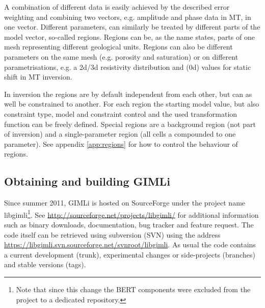 A combination of different data is easily achieved by the described error weighting and combining two vectors, e.g. amplitude and phase data in MT, in one vector.
Different parameters, can similarly be treated by different parts of the model vector, so-called regions.
Regions can be, as the name states, parts of one mesh representing different geological units.
Regions can also be different parameters on the same mesh (e.g. porosity and saturation) or on different parametrisations, e.g. a 2d/3d resistivity distribution and (0d) values for static shift in MT inversion.

In inversion the regions are by default independent from each other, but can as well be constrained to another.
For each region the starting model value, but also constraint type, model and constraint control and the used transformation function can be freely defined.
Special regions are a background region (not part of inversion) and a single-parameter region (all cells a compounded to one parameter). See appendix \ref{app:regions} for how to control the behaviour of regions.

\subsection{Obtaining and building GIMLi}
Since summer 2011, GIMLi is hosted on SourceForge under the project name libgimli\footnote{Note that since this change the BERT components were excluded from the project to a dedicated repository.}.
See \url{http://sourceforge.net/projects/libgimli/} for additional information such as binary downloads, documentation, bug tracker and feature request.
The code itself can be retrieved using subversion (SVN) using the address \url{https://libgimli.svn.sourceforge.net/svnroot/libgimli}.
As usual the code contains a current development (trunk), experimental changes or side-projects (branches) and stable versions (tags).

